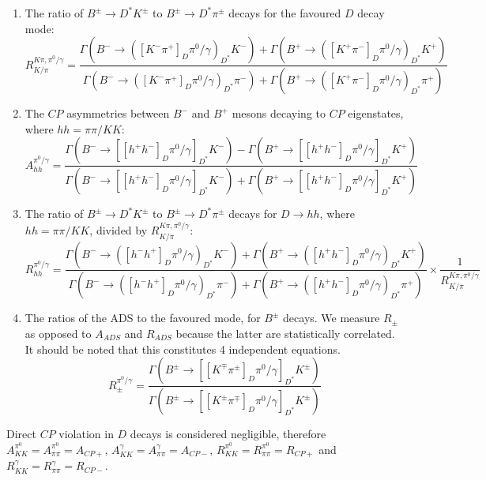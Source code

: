 \documentclass[oneside,12pt]{article}
\begin{document}
\begin{enumerate}
  \item The ratio of $B^{\pm} \rightarrow D^* K^{\pm}$ to $B^{\pm} \rightarrow
  D^* \pi^{\pm}$ decays for the favoured $D$ decay mode:
  \begin{equation}
    R^{K\pi , \pi^0 /\gamma}_{K/\pi}=\frac{\Gamma(B^{-}\rightarrow
    ([K^{-}\pi^{+}]_D\pi^0 /\gamma)_{D^*}K^{-})+\Gamma(B^{+}\rightarrow
    ([K^{+}\pi^{-}]_D\pi^0 /\gamma)_{D^*}K^{+})}{\Gamma(B^{-}\rightarrow
    ([K^{-}\pi^{+}]_D\pi^0 /\gamma)_{D^*}\pi^{-})+\Gamma(B^{+}\rightarrow
    ([K^{+}\pi^{-}]_D\pi^0 /\gamma)_{D^*}\pi^{+})}
  \end{equation}
  \item The $CP$ asymmetries between $B^{-}$ and $B^{+}$ mesons decaying to $CP$
  eigenstates, where $hh=\pi \pi /KK$:
		\begin{equation}
      A_{hh}^{\pi^{0}/\gamma}=\frac{\Gamma(B^{-}\rightarrow
      [[h^{+}h^{-}]_{D}\pi^{0}/\gamma]_{D^{*}}K^{-})-\Gamma(B^{+}\rightarrow
      [[h^{+}h^{-}]_{D}\pi^{0}/\gamma]_{D^{*}}K^{+})}{\Gamma(B^{-}\rightarrow
      [[h^{+}h^{-}]_{D}\pi^{0}/\gamma]_{D^{*}}K^{-})+\Gamma(B^{+}\rightarrow
      [[h^{+}h^{-}]_{D}\pi^{0}/\gamma]_{D^{*}}K^{+})} \label{eq:Aglw}
		\end{equation}
  \item The ratio of $B^{\pm} \rightarrow D^* K^{\pm}$ to $B^{\pm} \rightarrow
  D^* \pi^{\pm}$ decays for $D\rightarrow hh$, where $hh=\pi \pi /KK$, divided
  by $R^{K\pi , \pi^0 /\gamma}_{K/\pi}$:
		\begin{equation}
      R_{hh}^{\pi^{0}/\gamma}=\frac{\Gamma(B^{-}\rightarrow
      ([h^{-}h^{+}]_D\pi^0 /\gamma)_{D^*}K^{-})+\Gamma(B^{+}\rightarrow
      ([h^{+}h^{-}]_D\pi^0 /\gamma)_{D^*}K^{+})}{\Gamma(B^{-}\rightarrow
      ([h^{-}h^{+}]_D\pi^0 /\gamma)_{D^*}\pi^{-})+\Gamma(B^{+}\rightarrow
      ([h^{+}h^{-}]_D\pi^0 /\gamma)_{D^*}\pi^{+})} \times \frac{1}{R^{K\pi ,
      \pi^0 /\gamma}_{K/\pi}}
		\end{equation}
  \item The ratios of the ADS to the favoured mode, for $B^{\pm}$ decays. We
  measure $R_{\pm}$ as opposed to $A_{ADS}$ and $R_{ADS}$ because the latter are
  statistically correlated. It should be noted that this constitutes 4
  independent equations.
		\begin{equation}
			R_{\pm}^{\pi^{0}/\gamma}=\frac{\Gamma(B^{\pm}\rightarrow
			[[K^{\mp}\pi^{\pm}]_{D}\pi^{0}/\gamma]_{D^{*}}K^{\pm})}{\Gamma(B^{\pm}\rightarrow
			[[K^{\pm}\pi^{\mp}]_{D}\pi^{0}/\gamma]_{D^{*}}K^{\pm})} \label{eq:Rads}
		\end{equation}
\end{enumerate}
\noindent Direct $CP$ violation in $D$ decays is considered negligible, therefore
$A_{KK}^{\pi^{0}}=A_{\pi\pi}^{\pi^{0}}=A_{CP+}$,
$A_{KK}^{\gamma}=A_{\pi\pi}^{\gamma}=A_{CP-}$,
$R_{KK}^{\pi^{0}}=R_{\pi\pi}^{\pi^{0}}=R_{CP+}$ and
$R_{KK}^{\gamma}=R_{\pi\pi}^{\gamma}=R_{CP-}$.
\end{document}
